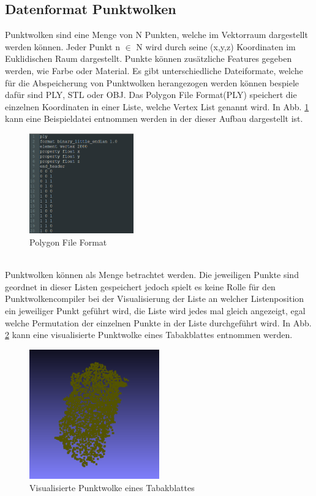 \documentclass{llncs}
\begin{document}
\subsection{Datenformat Punktwolken}\label{sec:punktwolken}

Punktwolken sind eine Menge von N Punkten, welche im Vektorraum dargestellt werden können. Jeder Punkt n $\in$ N wird durch seine (x,y,z) Koordinaten im Euklidischen Raum dargestellt. Punkte können zusätzliche Features gegeben werden, wie Farbe oder Material. Es gibt unterschiedliche Dateiformate, welche für die Abspeicherung von Punktwolken herangezogen werden können bespiele dafür sind PLY, STL oder OBJ. Das Polygon File Format(PLY) speichert die einzelnen Koordinaten in einer Liste, welche Vertex List genannt wird. In Abb. \ref{fig:Bild7} kann eine Beispieldatei entnommen werden in der dieser Aufbau dargestellt ist. 
\\
\begin{figure}[htbp] 
	\centering
	\includegraphics[width=0.4\textwidth]{plyexample.png}
	\caption{Polygon File Format}
	\label{fig:Bild7}
\end{figure}
\\
Punktwolken können als Menge betrachtet werden. Die jeweiligen Punkte sind geordnet in dieser Listen gespeichert jedoch spielt es keine Rolle für den Punktwolkencompiler bei der Visualisierung der Liste an welcher Listenposition ein jeweiliger Punkt geführt wird, die Liste wird jedes mal gleich angezeigt, egal welche Permutation der einzelnen Punkte in der Liste durchgeführt wird. In Abb. \ref{fig:Bild8} kann eine visualisierte Punktwolke eines Tabakblattes entnommen werden. 
\\
\begin{figure}[htbp] 
	\centering
	\includegraphics[width=0.5\textwidth]{leaf1.png}
	\caption{Visualisierte Punktwolke eines Tabakblattes}
	\label{fig:Bild8}
\end{figure}
\newpage
\end{document}
